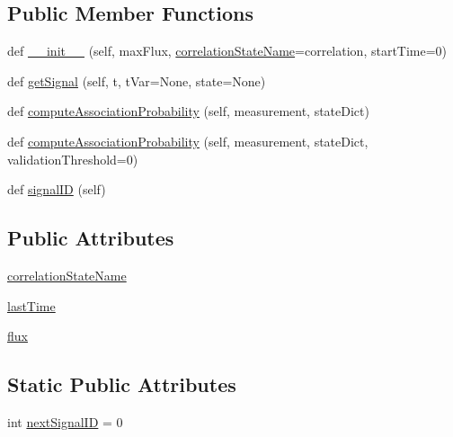 \subsection*{Public Member Functions}
\begin{DoxyCompactItemize}
\item 
def \hyperlink{classmodest_1_1signals_1_1poissonsource_1_1DynamicPoissonSource_a6233c4e62e4a313aa407cb0e8caa2a52}{\+\_\+\+\_\+init\+\_\+\+\_\+} (self, max\+Flux, \hyperlink{classmodest_1_1signals_1_1poissonsource_1_1DynamicPoissonSource_ac7f62303bb8a417a1ddefb032c707bcd}{correlation\+State\+Name}=\textquotesingle{}correlation\textquotesingle{}, start\+Time=0)
\item 
def \hyperlink{classmodest_1_1signals_1_1poissonsource_1_1DynamicPoissonSource_a01804453d22cab5811218a98557a8b0c}{get\+Signal} (self, t, t\+Var=None, state=None)
\item 
def \hyperlink{classmodest_1_1signals_1_1poissonsource_1_1DynamicPoissonSource_a6c8820d8007c848d745f9313efdb970c}{compute\+Association\+Probability} (self, measurement, state\+Dict)
\item 
def \hyperlink{classmodest_1_1signals_1_1signalsource_1_1SignalSource_a3d32dbed840ea9ac775b226f0a654831}{compute\+Association\+Probability} (self, measurement, state\+Dict, validation\+Threshold=0)
\item 
def \hyperlink{classmodest_1_1signals_1_1signalsource_1_1SignalSource_a9a64c6a9c2954f6ad61e4ca3518ea8ab}{signal\+ID} (self)
\end{DoxyCompactItemize}
\subsection*{Public Attributes}
\begin{DoxyCompactItemize}
\item 
\hyperlink{classmodest_1_1signals_1_1poissonsource_1_1DynamicPoissonSource_ac7f62303bb8a417a1ddefb032c707bcd}{correlation\+State\+Name}
\item 
\hyperlink{classmodest_1_1signals_1_1poissonsource_1_1PoissonSource_a34395fc83bd8743a0a5ee69f9392a606}{last\+Time}
\item 
\hyperlink{classmodest_1_1signals_1_1poissonsource_1_1PoissonSource_a6f2c657ad936b921715d826ac74f7fe5}{flux}
\end{DoxyCompactItemize}
\subsection*{Static Public Attributes}
\begin{DoxyCompactItemize}
\item 
int \hyperlink{classmodest_1_1signals_1_1signalsource_1_1SignalSource_a453eafb550b551adbec0903deb63dfce}{next\+Signal\+ID} = 0
\end{DoxyCompactItemize}
